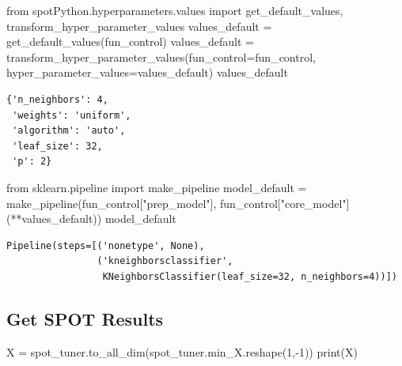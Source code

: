 \documentclass[
  letterpaper,
  DIV=11,
  numbers=noendperiod]{scrreprt}
\newenvironment{Shaded}{\begin{snugshade}}{\end{snugshade}}
\newcommand{\BuiltInTok}[1]{\textcolor[rgb]{0.00,0.23,0.31}{#1}}
\newcommand{\DecValTok}[1]{\textcolor[rgb]{0.68,0.00,0.00}{#1}}
\newcommand{\ImportTok}[1]{\textcolor[rgb]{0.00,0.46,0.62}{#1}}
\newcommand{\NormalTok}[1]{\textcolor[rgb]{0.00,0.23,0.31}{#1}}
\newcommand{\OperatorTok}[1]{\textcolor[rgb]{0.37,0.37,0.37}{#1}}
\newcommand{\StringTok}[1]{\textcolor[rgb]{0.13,0.47,0.30}{#1}}
\begin{document}
\begin{Shaded}
\begin{Highlighting}[]
\ImportTok{from}\NormalTok{ spotPython.hyperparameters.values }\ImportTok{import}\NormalTok{ get\_default\_values, transform\_hyper\_parameter\_values}
\NormalTok{values\_default }\OperatorTok{=}\NormalTok{ get\_default\_values(fun\_control)}
\NormalTok{values\_default }\OperatorTok{=}\NormalTok{ transform\_hyper\_parameter\_values(fun\_control}\OperatorTok{=}\NormalTok{fun\_control, hyper\_parameter\_values}\OperatorTok{=}\NormalTok{values\_default)}
\NormalTok{values\_default}
\end{Highlighting}
\end{Shaded}

\begin{verbatim}
{'n_neighbors': 4,
 'weights': 'uniform',
 'algorithm': 'auto',
 'leaf_size': 32,
 'p': 2}
\end{verbatim}

\begin{Shaded}
\begin{Highlighting}[]
\ImportTok{from}\NormalTok{ sklearn.pipeline }\ImportTok{import}\NormalTok{ make\_pipeline}
\NormalTok{model\_default }\OperatorTok{=}\NormalTok{ make\_pipeline(fun\_control[}\StringTok{"prep\_model"}\NormalTok{], fun\_control[}\StringTok{"core\_model"}\NormalTok{](}\OperatorTok{**}\NormalTok{values\_default))}
\NormalTok{model\_default}
\end{Highlighting}
\end{Shaded}

\begin{verbatim}
Pipeline(steps=[('nonetype', None),
                ('kneighborsclassifier',
                 KNeighborsClassifier(leaf_size=32, n_neighbors=4))])
\end{verbatim}

\hypertarget{get-spot-results-4}{%
\subsection{Get SPOT Results}\label{get-spot-results-4}}

\begin{Shaded}
\begin{Highlighting}[]
\NormalTok{X }\OperatorTok{=}\NormalTok{ spot\_tuner.to\_all\_dim(spot\_tuner.min\_X.reshape(}\DecValTok{1}\NormalTok{,}\OperatorTok{{-}}\DecValTok{1}\NormalTok{))}
\BuiltInTok{print}\NormalTok{(X)}
\end{Highlighting}
\end{Shaded}
\end{document}
